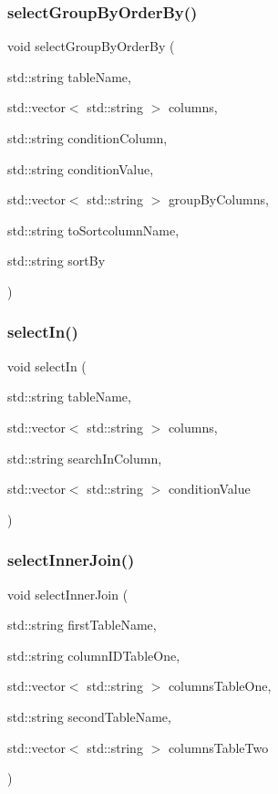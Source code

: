 \subsubsection{select\+Group\+By\+Order\+By()}
{\footnotesize\ttfamily void select\+Group\+By\+Order\+By (\begin{DoxyParamCaption}\item[{std\+::string}]{table\+Name,  }\item[{std\+::vector$<$ std\+::string $>$}]{columns,  }\item[{std\+::string}]{condition\+Column,  }\item[{std\+::string}]{condition\+Value,  }\item[{std\+::vector$<$ std\+::string $>$}]{group\+By\+Columns,  }\item[{std\+::string}]{to\+Sortcolumn\+Name,  }\item[{std\+::string}]{sort\+By }\end{DoxyParamCaption})}

\mbox{\label{sqllib_8hpp_ac3a0a9620e1b5ac8c90104b1daea4f5f}} 
\subsubsection{select\+In()}
{\footnotesize\ttfamily void select\+In (\begin{DoxyParamCaption}\item[{std\+::string}]{table\+Name,  }\item[{std\+::vector$<$ std\+::string $>$}]{columns,  }\item[{std\+::string}]{search\+In\+Column,  }\item[{std\+::vector$<$ std\+::string $>$}]{condition\+Value }\end{DoxyParamCaption})}

\mbox{\label{sqllib_8hpp_aa0d6684a1d4f8e82d699b713e38c9d44}} 
\subsubsection{select\+Inner\+Join()}
{\footnotesize\ttfamily void select\+Inner\+Join (\begin{DoxyParamCaption}\item[{std\+::string}]{first\+Table\+Name,  }\item[{std\+::string}]{column\+I\+D\+Table\+One,  }\item[{std\+::vector$<$ std\+::string $>$}]{columns\+Table\+One,  }\item[{std\+::string}]{second\+Table\+Name,  }\item[{std\+::vector$<$ std\+::string $>$}]{columns\+Table\+Two }\end{DoxyParamCaption})}

